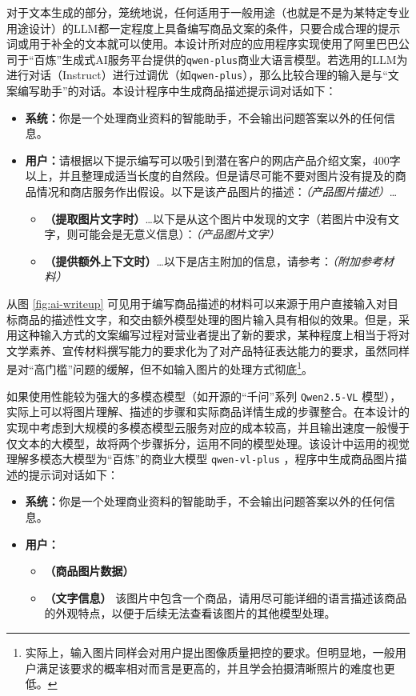 对于文本生成的部分，笼统地说，任何适用于一般用途（也就是不是为某特定专业用途设计）的LLM都一定程度上具备编写商品文案的条件，只要合成合理的提示词或用于补全的文本就可以使用。本设计所对应的应用程序实现使用了阿里巴巴公司于“百炼”生成式AI服务平台提供的\verb|qwen-plus|商业大语言模型。若选用的LLM为进行对话（Instruct）进行过调优（如\verb|qwen-plus|），那么比较合理的输入是与“文案编写助手”的对话。本设计程序中生成商品描述提示词对话如下：

\begin{itemize}
    \item[] \textbf{系统：}你是一个处理商业资料的智能助手，不会输出问题答案以外的任何信息。
    \item[] \textbf{用户：}请根据以下提示编写可以吸引到潜在客户的网店产品介绍文案，400字以上，并且整理成适当长度的自然段。但是请尽可能不要对图片没有提及的商品情况和商店服务作出假设。以下是该产品图片的描述：\textit{（产品图片描述）}\dots
    \begin{itemize}
        \item[] \textbf{（提取图片文字时）}\dots 以下是从这个图片中发现的文字（若图片中没有文字，则可能会是无意义信息）：\textit{（产品图片文字）}
        \item[] \textbf{（提供额外上下文时）}\dots 以下是店主附加的信息，请参考：\textit{（附加参考材料）}
    \end{itemize}
\end{itemize}

从图 \ref{fig:ai-writeup} 可见用于编写商品描述的材料可以来源于用户直接输入对目标商品的描述性文字，和交由额外模型处理的图片输入具有相似的效果。但是，采用这种输入方式的文案编写过程对营业者提出了新的要求，某种程度上相当于将对文学素养、宣传材料撰写能力的要求化为了对产品特征表达能力的要求，虽然同样是对“高门槛”问题的缓解，但不如输入图片的处理方式彻底\footnote{实际上，输入图片同样会对用户提出图像质量把控的要求。但明显地，一般用户满足该要求的概率相对而言是更高的，并且学会拍摄清晰照片的难度也更低。}。

如果使用性能较为强大的多模态模型（如开源的“千问”系列 \verb|Qwen2.5-VL| 模型），实际上可以将图片理解、描述的步骤和实际商品详情生成的步骤整合。在本设计的实现中考虑到大规模的多模态模型云服务对应的成本较高，并且输出速度一般慢于仅文本的大模型，故将两个步骤拆分，运用不同的模型处理。该设计中运用的视觉理解多模态大模型为“百炼”的商业大模型 \verb|qwen-vl-plus| ，程序中生成商品图片描述的提示词对话如下：

\begin{itemize}
    \item[] \textbf{系统：}你是一个处理商业资料的智能助手，不会输出问题答案以外的任何信息。
    \item[] \textbf{用户：}
    \begin{itemize}
        \item[] \textbf{（商品图片数据）}
        \item[] \textbf{（文字信息）} 该图片中包含一个商品，请用尽可能详细的语言描述该商品的外观特点，以便于后续无法查看该图片的其他模型处理。
    \end{itemize}
\end{itemize}

